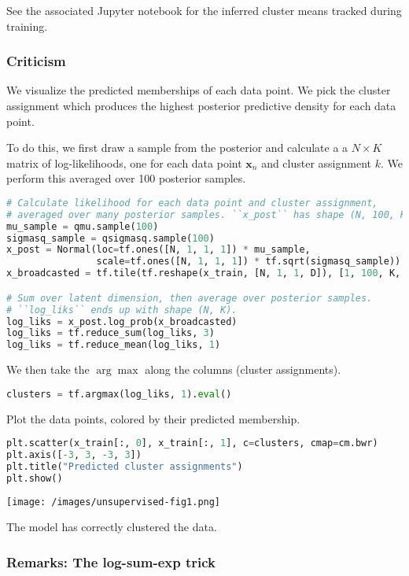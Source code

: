 See the associated Jupyter notebook for the inferred cluster means
tracked during training.

\subsubsection{Criticism}

We visualize the predicted memberships of each data point. We pick
the cluster assignment which produces the highest posterior predictive
density for each data point.

To do this, we first draw a sample from the posterior and calculate a
a $N\times K$ matrix of log-likelihoods, one for each data point
$\mathbf{x}_n$ and cluster assignment $k$.
We perform this averaged over 100 posterior samples.

\begin{lstlisting}[language=Python]
# Calculate likelihood for each data point and cluster assignment,
# averaged over many posterior samples. ``x_post`` has shape (N, 100, K, D).
mu_sample = qmu.sample(100)
sigmasq_sample = qsigmasq.sample(100)
x_post = Normal(loc=tf.ones([N, 1, 1, 1]) * mu_sample,
                scale=tf.ones([N, 1, 1, 1]) * tf.sqrt(sigmasq_sample))
x_broadcasted = tf.tile(tf.reshape(x_train, [N, 1, 1, D]), [1, 100, K, 1])

# Sum over latent dimension, then average over posterior samples.
# ``log_liks`` ends up with shape (N, K).
log_liks = x_post.log_prob(x_broadcasted)
log_liks = tf.reduce_sum(log_liks, 3)
log_liks = tf.reduce_mean(log_liks, 1)
\end{lstlisting}

We then take the $\arg\max$ along the columns (cluster assignments).
\begin{lstlisting}[language=Python]
clusters = tf.argmax(log_liks, 1).eval()
\end{lstlisting}

Plot the data points, colored by their predicted membership.
\begin{lstlisting}[language=Python]
plt.scatter(x_train[:, 0], x_train[:, 1], c=clusters, cmap=cm.bwr)
plt.axis([-3, 3, -3, 3])
plt.title("Predicted cluster assignments")
plt.show()
\end{lstlisting}

\texttt{[image: /images/unsupervised-fig1.png]}

The model has correctly clustered the data.

\subsubsection{Remarks: The log-sum-exp trick}

